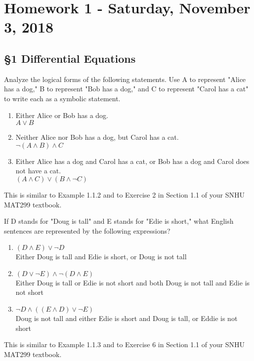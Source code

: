 \chapter{Homework 1 - Saturday, November 3, 2018}
\section{\S 1 Differential Equations}
\begin{prob}
Analyze the logical forms of the following statements. Use A to represent "Alice has a dog," B to represent "Bob has a dog," and C to represent "Carol has a cat" to write each as a symbolic statement.
\begin{enumerate}
\item Either Alice or Bob has a dog.\\
$A \vee B $
\item Neither Alice nor Bob has a dog, but Carol has a cat.\\
$ \neg (A \wedge B) \wedge C $
\item Either Alice has a dog and Carol has a cat, or Bob has a dog and Carol does not have a cat.\\
$ (A \wedge C) \vee (B \wedge \neg C) $
\end{enumerate}
This is similar to Example 1.1.2 and to Exercise 2 in Section 1.1 of your SNHU MAT299 textbook.
\end{prob}
\begin{prob}
If D stands for "Doug is tall" and E stands for "Edie is short," what English sentences are represented by the following expressions?
\begin{enumerate}
\item $(D \wedge E) \vee \neg D$\\
Either Doug is tall and Edie is short, or Doug is not tall
\item $(D \vee \neg E) \wedge \neg(D \wedge E)$\\
Either Doug is tall or Edie is not short and both Doug is not tall and Edie is not short
\item $\neg D \wedge ((E \wedge D) \vee \neg E )$\\
Doug is not tall and either Edie is short and Doug is tall, or Eddie is not short
\end{enumerate}
This is similar to Example 1.1.3 and to Exercise 6 in Section 1.1 of your SNHU MAT299 textbook.
\end{prob}
